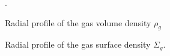 \clearpage
\begin{figure}[h!]
    \caption{Radial profile of the gas volume density $\rho_g$}.
\end{figure}

\begin{figure}[h!]
    \caption{Radial profile of the gas surface density $\Sigma_g$.
    }
\end{figure}


